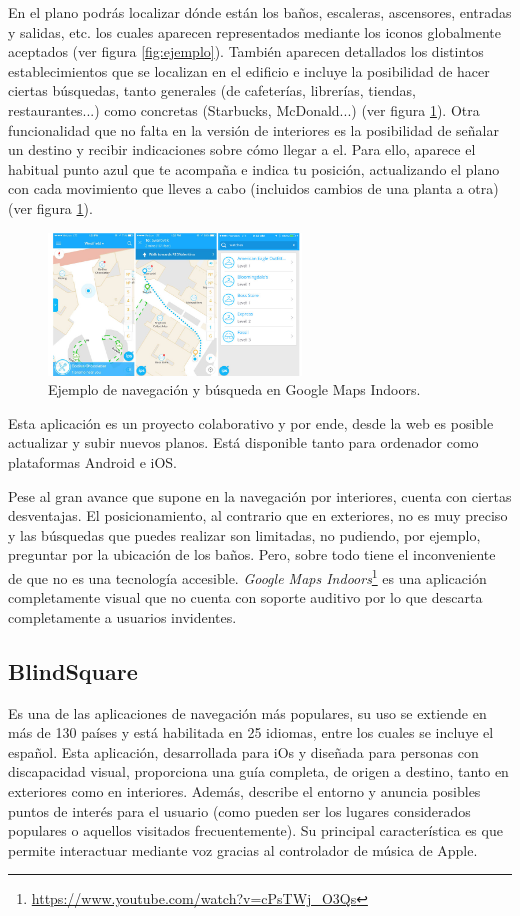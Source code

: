En el plano podrás localizar dónde están los baños, escaleras, ascensores, entradas y salidas, etc. los cuales aparecen representados mediante los iconos globalmente aceptados (ver figura \ref{fig:ejemplo}). También aparecen detallados los distintos establecimientos que se localizan en el edificio e incluye la posibilidad de hacer ciertas búsquedas, tanto generales (de cafeterías, librerías, tiendas, restaurantes...) como concretas (Starbucks, McDonald...) (ver figura \ref{fig:ejemplo3}). Otra funcionalidad que no falta en la versión de interiores es la posibilidad de señalar un destino y recibir indicaciones sobre cómo llegar a el. Para ello, aparece el habitual punto azul que te acompaña e indica tu posición, actualizando el plano con cada movimiento que lleves a cabo (incluidos cambios de una planta a otra) (ver figura \ref{fig:ejemplo3}).

\begin{figure}[t]
	\centering
	\includegraphics[width=0.6\textwidth]{GMapsInd}
	\caption{Ejemplo de navegación y búsqueda en Google Maps Indoors. }
	\label{fig:ejemplo3}
\end{figure}
Esta aplicación es un proyecto colaborativo y por ende, desde la web es posible actualizar y subir nuevos planos. Está disponible tanto para ordenador como plataformas Android e iOS.

Pese al gran avance que supone en la navegación por interiores, cuenta con ciertas desventajas. El posicionamiento, al contrario que en exteriores, no es muy preciso y las búsquedas que puedes realizar son limitadas, no pudiendo, por ejemplo, preguntar por la ubicación de los baños. Pero, sobre todo tiene el inconveniente de que no es una tecnología accesible. \textit{Google Maps Indoors}\footnote{\url{https://www.youtube.com/watch?v=cPsTWj_O3Qs}} es una aplicación completamente visual que no cuenta con soporte auditivo por lo que descarta completamente a usuarios invidentes.


\subsection{BlindSquare}
Es una de las aplicaciones de navegación más populares, su uso se extiende en más de 130 países y está habilitada en 25 idiomas, entre los cuales se incluye el español. Esta aplicación, desarrollada para iOs y diseñada para personas con discapacidad visual, proporciona una guía completa, de origen a destino, tanto en exteriores como en interiores. Además, describe el entorno y anuncia posibles puntos de interés para el usuario (como pueden ser los lugares considerados populares o aquellos visitados frecuentemente). Su principal característica es que permite interactuar mediante voz gracias al controlador de música de Apple. 


